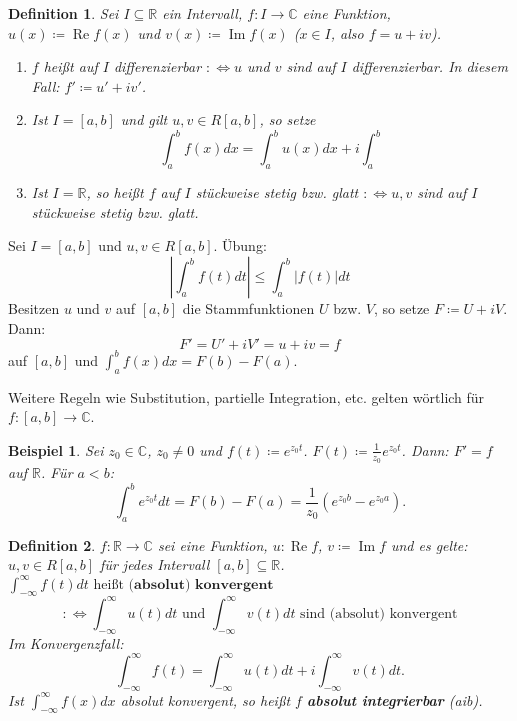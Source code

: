 \documentclass[12pt]{extreport} %
\newcommand{\C}{\mathbb{C}}
\newcommand{\R}{\mathbb{R}}
\theoremstyle{named}
\theoremstyle{nnamed}
\theoremstyle{itshape}
\newtheorem*{definition}{Definition}
\theoremstyle{normal}
\newtheorem*{beispiel*}{Beispiel}
\begin{document}
   
\begin{definition}
	Sei $I \subseteq \R$ ein Intervall, $f \colon I \rightarrow \C$ eine Funktion, $u(x) \coloneqq \operatorname{Re}f(x)$ und $v(x) \coloneqq \operatorname{Im}f(x)$ ($x \in I$, also $f = u + iv$).
	\begin{enumerate}
		\item $f$ hei{\ss}t auf $I$ differenzierbar $:\iff u$ und $v$ sind auf $I$ differenzierbar. In diesem Fall: $f' \coloneqq u' + i v'$.
		\item Ist $I = [a, b]$ und gilt $u, v \in R[a, b]$, so setze
			$$ \int_{a}^{b} f(x) dx = \int_{a}^{b} u(x) dx + i \int_{a}^{b} $$
		\item Ist $I = \R$, so hei{\ss}t $f$ auf $I$ stückweise stetig bzw. glatt $:\iff u,v$ sind auf $I$ stückweise stetig bzw. glatt.
	\end{enumerate}	
\end{definition}


Sei $I = [a, b]$ und $u, v \in R[a, b]$. Übung:
	$$ \left| \int_{a}^{b} f(t) dt \right| \leq \int_{a}^{b} \left| f(t) \right| dt $$
Besitzen $u$ und $v$ auf $[a, b]$ die Stammfunktionen $U$ bzw. $V$, so setze $F \coloneqq U + iV$. Dann:
	$$ F' = U' + i V' = u + iv = f $$
auf $[a, b]$ und $\int_{a}^{b} f(x) dx = F(b) - F(a)$.

\bigskip

Weitere Regeln wie Substitution, partielle Integration, etc. gelten wörtlich für $f \colon [a, b] \rightarrow \C$.


\begin{beispiel*}
	Sei $z_{0} \in \C$, $z_{0} \neq 0$ und $f(t) \coloneqq e^{z_{0} t}$. $F(t) \coloneqq \frac{1}{z_{0}} e^{z_{0} t}$. Dann: $F' = f$ auf $\R$. Für $a < b$:
	$$ \int_{a}^{b} e^{z_{0} t} dt = F(b) - F(a) = \frac{1}{z_{0}} \left( e^{z_{0}b} - e^{z_{0}a} \right). $$	
\end{beispiel*}

  
\begin{definition}
	$f \colon \R \rightarrow \C$ sei eine Funktion, $u \colon \operatorname{Re}f$, $v \coloneqq \operatorname{Im}f$ und es gelte: $u, v \in R[a, b]$ für jedes Intervall $[a, b] \subseteq \R$. $\int_{-\infty}^{\infty} f(t) dt \text{ hei{\ss}t } \textbf{(absolut) konvergent}$
	$$ :\iff \int_{-\infty}^{\infty} u(t) dt \text{ und } \int_{-\infty}^{\infty} v(t) dt \text{ sind (absolut) konvergent} $$
	Im Konvergenzfall: 
	$$ \int_{-\infty}^{\infty} f(t) = \int_{-\infty}^{\infty} u(t) dt + i \int_{-\infty}^{\infty} v(t) dt. $$
	Ist $\int_{-\infty}^{\infty} f(x) dx$ absolut konvergent, so hei{\ss}t $f$ \textbf{absolut integrierbar} (aib).
\end{definition}
\end{document}
